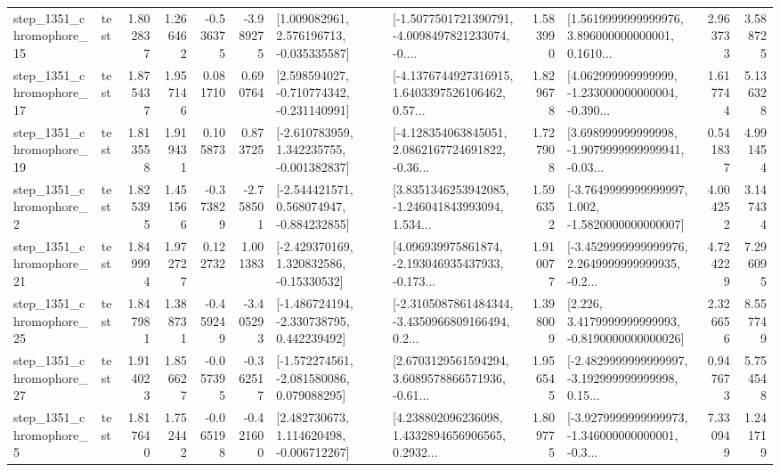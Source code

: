 \begin{tabular}{llrrrrllrlrr}
 step\_1351\_chromophore\_15 &      test &      1.802837 &    1.266462 &     -0.536375 & -3.989275 &    [1.009082961, 2.576196713, -0.035335587] &  [-1.5077501721390791, -4.0098497821233074, -0.... &       1.583990 &  [1.5619999999999976, 3.896000000000001, 0.1610... &            2.963733 &          3.588725 \\
 step\_1351\_chromophore\_17 &      test &      1.875437 &    1.957146 &      0.081710 &  0.690764 &   [2.598594027, -0.710774342, -0.231140991] &  [-4.1376744927316915, 1.6403397526106462, 0.57... &       1.829678 &  [4.062999999999999, -1.233000000000004, -0.390... &            1.617744 &          5.136328 \\
 step\_1351\_chromophore\_19 &      test &      1.813558 &    1.919431 &      0.105873 &  0.873725 &   [-2.610783959, 1.342235755, -0.001382837] &  [-4.128354063845051, 2.0862167724691822, -0.36... &       1.727908 &  [3.698999999999998, -1.9079999999999941, -0.03... &            0.541837 &          4.991454 \\
  step\_1351\_chromophore\_2 &      test &      1.825395 &    1.451566 &     -0.373829 & -2.758501 &   [-2.544421571, 0.568074947, -0.884232855] &  [3.8351346253942085, -1.246041843993094, 1.534... &       1.596352 &  [-3.7649999999999997, 1.002, -1.5820000000000007] &            4.004252 &          3.147434 \\
 step\_1351\_chromophore\_21 &      test &      1.849994 &    1.972727 &      0.122732 &  1.001383 &    [-2.429370169, 1.320832586, -0.15330532] &  [4.096939975861874, -2.193046935437933, -0.173... &       1.910077 &  [-3.4529999999999976, 2.2649999999999935, -0.2... &            4.724229 &          7.296095 \\
 step\_1351\_chromophore\_25 &      test &      1.847981 &    1.388731 &     -0.459249 & -3.405293 &   [-1.486724194, -2.330738795, 0.442239492] &  [-2.3105087861484344, -3.4350966809166494, 0.2... &       1.398009 &   [2.226, 3.4179999999999993, -0.8190000000000026] &            2.326656 &          8.557749 \\
 step\_1351\_chromophore\_27 &      test &      1.914023 &    1.856627 &     -0.057395 & -0.362517 &   [-1.572274561, -2.081580086, 0.079088295] &  [2.6703129561594294, 3.6089578866571936, -0.61... &       1.956545 &  [-2.4829999999999997, -3.192999999999998, 0.15... &            0.947673 &          5.754548 \\
  step\_1351\_chromophore\_5 &      test &      1.817640 &    1.752442 &     -0.065198 & -0.421600 &    [2.482730673, 1.114620498, -0.006712267] &  [4.238802096236098, 1.4332894656906565, 0.2932... &       1.809775 &  [-3.9279999999999973, -1.346000000000001, -0.3... &            7.330949 &          1.241719 \\

\end{tabular}
